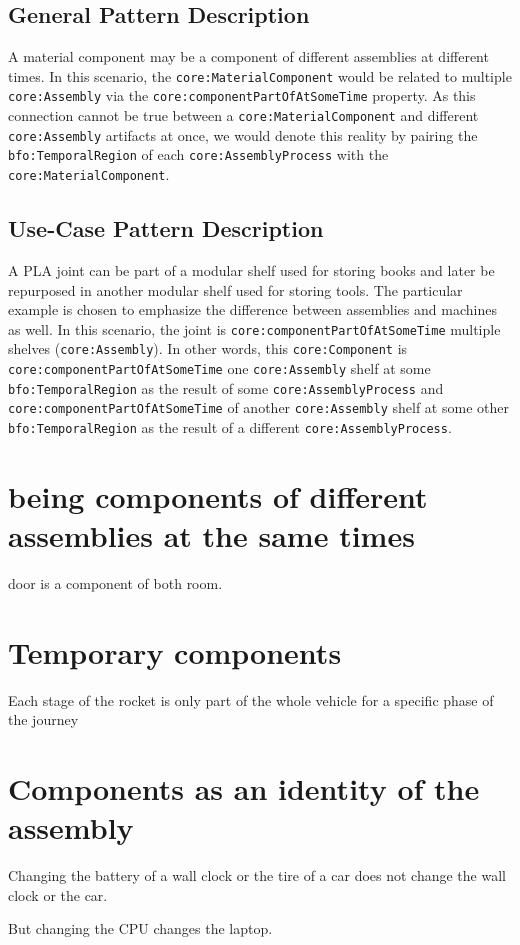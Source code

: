 \subsection*{General Pattern Description}
A material component may be a component of different assemblies at different times. In this scenario, the \texttt{core:MaterialComponent} would be related to multiple \texttt{core:Assembly} via the \texttt{core:componentPartOfAtSomeTime} property. As this connection cannot be true between a \texttt{core:MaterialComponent} and different \texttt{core:Assembly} artifacts at once, we would denote this reality by pairing the \texttt{bfo:TemporalRegion} of each \texttt{core:AssemblyProcess} with the \texttt{core:MaterialComponent}.

\subsection*{Use-Case Pattern Description}
A PLA joint can be part of a modular shelf used for storing books and later be repurposed in another modular shelf used for storing tools. The particular example is chosen to emphasize the difference between assemblies and machines as well. In this scenario, the joint is \texttt{core:componentPartOfAtSomeTime} multiple shelves (\texttt{core:Assembly}). In other words, this \texttt{core:Component} is \texttt{core:componentPartOfAtSomeTime} one \texttt{core:Assembly} shelf at some \texttt{bfo:TemporalRegion} as the result of some \texttt{core:AssemblyProcess} and \texttt{core:componentPartOfAtSomeTime} of another \texttt{core:Assembly} shelf at some other \texttt{bfo:TemporalRegion} as the result of a different \texttt{core:AssemblyProcess}.

\section{being components of different assemblies at the same times}

door is a component of both room.

\section{Temporary components}

Each stage of the rocket is only part of the whole vehicle for a specific phase of the journey

\section {Components as an identity of the assembly}

Changing the battery of a wall clock or the tire of a car does not change the wall clock or the car.

But changing the CPU changes the laptop. 








